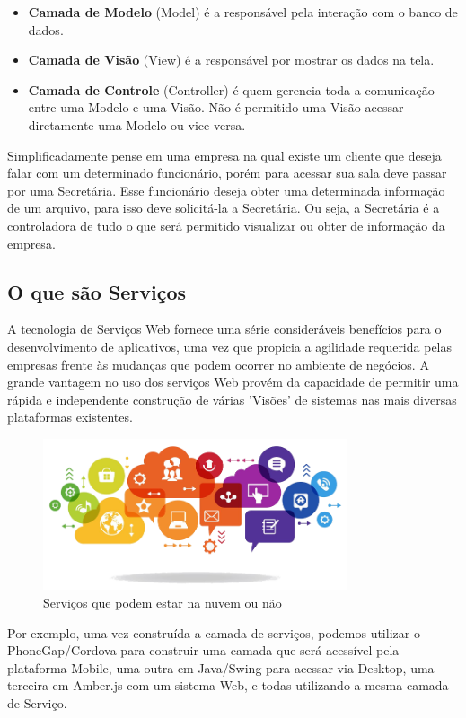 \documentclass[a4paper,11pt]{article}
\begin{document}
\begin{itemize} \vspace{-1em}
  \item \textbf{Camada de Modelo} (Model) é a responsável pela interação com o banco de dados. 
  \item \textbf{Camada de Visão} (View) é a responsável por mostrar os dados na tela.
  \item \textbf{Camada de Controle} (Controller) é quem gerencia toda a comunicação entre uma Modelo e uma Visão. Não é permitido uma Visão acessar diretamente uma Modelo ou vice-versa.
\end{itemize}

Simplificadamente pense em uma empresa na qual existe um cliente que deseja falar com um determinado funcionário, porém para acessar sua sala deve passar por uma Secretária. Esse funcionário deseja obter uma determinada informação de um arquivo, para isso deve solicitá-la a Secretária. Ou seja, a Secretária é a controladora de tudo o que será permitido visualizar ou obter de informação da empresa.

\subsection{O que são Serviços}
A tecnologia de Serviços Web fornece uma série consideráveis benefícios para o desenvolvimento de aplicativos, uma vez que propicia a agilidade requerida pelas empresas frente às mudanças que podem ocorrer no ambiente de negócios. A grande vantagem no uso dos serviços Web provém da capacidade de permitir uma rápida e independente construção de várias 'Visões' de sistemas nas mais diversas plataformas existentes. 
\begin{figure}[H]
	\centering
	\includegraphics[width=0.8\textwidth]{imagens/servicos.png}
	\caption{Serviços que podem estar na nuvem ou não}
\end{figure}

Por exemplo, uma vez construída a camada de serviços, podemos utilizar o PhoneGap/Cordova para construir uma camada que será acessível pela plataforma Mobile, uma outra em Java/Swing para acessar via Desktop, uma terceira em Amber.js com um sistema Web, e todas utilizando a mesma camada de Serviço.
\end{document}
